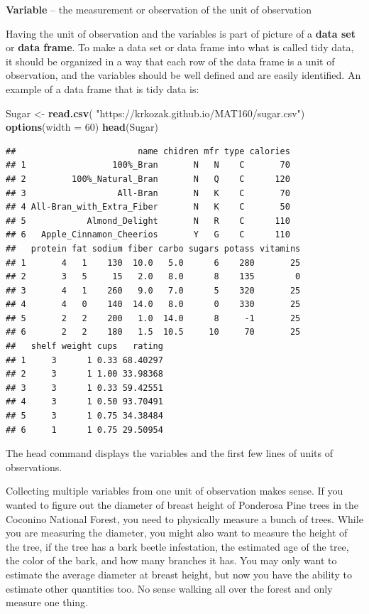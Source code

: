 \documentclass[
]{book}
\newenvironment{Shaded}{\begin{snugshade}}{\end{snugshade}}
\newcommand{\DataTypeTok}[1]{\textcolor[rgb]{0.13,0.29,0.53}{#1}}
\newcommand{\DecValTok}[1]{\textcolor[rgb]{0.00,0.00,0.81}{#1}}
\newcommand{\KeywordTok}[1]{\textcolor[rgb]{0.13,0.29,0.53}{\textbf{#1}}}
\newcommand{\NormalTok}[1]{#1}
\newcommand{\StringTok}[1]{\textcolor[rgb]{0.31,0.60,0.02}{#1}}
\begin{document}
\textbf{Variable} -- the measurement or observation of the unit of observation

Having the unit of observation and the variables is part of picture of a \textbf{data set} or \textbf{data frame}. To make a data set or data frame into what is called tidy data, it should be organized in a way that each row of the data frame is a unit of observation, and the variables should be well defined and are easily identified. An example of a data frame that is tidy data is:

\begin{Shaded}
\begin{Highlighting}[]
\NormalTok{Sugar <-}\StringTok{ }\KeywordTok{read.csv}\NormalTok{(}
        \StringTok{"https://krkozak.github.io/MAT160/sugar.csv"}\NormalTok{)}
\KeywordTok{options}\NormalTok{(}\DataTypeTok{width =} \DecValTok{60}\NormalTok{)}
\KeywordTok{head}\NormalTok{(Sugar) }
\end{Highlighting}
\end{Shaded}

\begin{verbatim}
##                        name chidren mfr type calories
## 1                 100%_Bran       N   N    C       70
## 2         100%_Natural_Bran       N   Q    C      120
## 3                  All-Bran       N   K    C       70
## 4 All-Bran_with_Extra_Fiber       N   K    C       50
## 5            Almond_Delight       N   R    C      110
## 6   Apple_Cinnamon_Cheerios       Y   G    C      110
##   protein fat sodium fiber carbo sugars potass vitamins
## 1       4   1    130  10.0   5.0      6    280       25
## 2       3   5     15   2.0   8.0      8    135        0
## 3       4   1    260   9.0   7.0      5    320       25
## 4       4   0    140  14.0   8.0      0    330       25
## 5       2   2    200   1.0  14.0      8     -1       25
## 6       2   2    180   1.5  10.5     10     70       25
##   shelf weight cups   rating
## 1     3      1 0.33 68.40297
## 2     3      1 1.00 33.98368
## 3     3      1 0.33 59.42551
## 4     3      1 0.50 93.70491
## 5     3      1 0.75 34.38484
## 6     1      1 0.75 29.50954
\end{verbatim}

The head command displays the variables and the first few lines of units of observations.

Collecting multiple variables from one unit of observation makes sense. If you wanted to figure out the diameter of breast height of Ponderosa Pine trees in the Coconino National Forest, you need to physically measure a bunch of trees. While you are measuring the diameter, you might also want to measure the height of the tree, if the tree has a bark beetle infestation, the estimated age of the tree, the color of the bark, and how many branches it has. You may only want to estimate the average diameter at breast height, but now you have the ability to estimate other quantities too. No sense walking all over the forest and only measure one thing.
\end{document}
